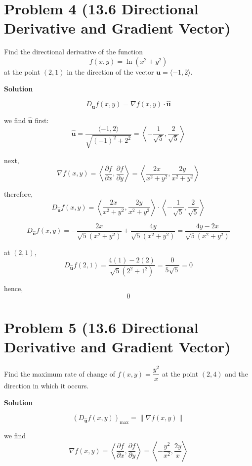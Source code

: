 \documentclass{article}
\newcommand{\solution}{\textbf{\large Solution}}
\theoremstyle{remark}
\begin{document}
\vspace{1em}
\hrulefill

\section*{Problem 4 (13.6 Directional Derivative and Gradient Vector)}
Find the directional derivative of the function
\[
    f(x,y) = \ln(x^2+y^2)
\]
at the point $(2,1)$ in the direction of the vector $\mathbf{u} = \langle -1,2 \rangle$.

\medskip
\solution

\[
    D_{\hat{\mathbf{u}}}f(x,y) = \nabla f(x,y) \cdot \hat{\mathbf{u}}
\]

we find $\hat{\mathbf{u}}$ first:
\[
    \hat{\mathbf{u}} = \frac{\langle -1,2 \rangle}{\sqrt{(-1)^2+2^2}} = \left\langle -\frac{1}{\sqrt{5}}, \frac{2}{\sqrt{5}} \right\rangle
\]

next,
\[
    \nabla f(x,y) = \left\langle \frac{\partial f}{\partial x}, \frac{\partial f}{\partial y} \right\rangle
    = \left\langle \frac{2x}{x^2+y^2}, \frac{2y}{x^2+y^2} \right\rangle
\]

therefore,
\[
    D_{\hat{\mathbf{u}}}f(x,y) = \left\langle \frac{2x}{x^2+y^2}, \frac{2y}{x^2+y^2} \right\rangle \cdot \left\langle -\frac{1}{\sqrt{5}}, \frac{2}{\sqrt{5}} \right\rangle
\]

\[
    D_{\hat{\mathbf{u}}}f(x,y) = -\frac{2x}{\sqrt{5}(x^2+y^2)} + \frac{4y}{\sqrt{5}(x^2+y^2)}
    = \frac{4y-2x}{\sqrt{5}(x^2+y^2)}
\]

at $(2,1)$,
\[
    D_{\hat{\mathbf{u}}}f(2,1) = \frac{4(1)-2(2)}{\sqrt{5}(2^2+1^2)} = \frac{0}{5\sqrt{5}} = 0
\]

hence,
\[
    \boxed{0}
\]

\vspace{1em}
\hrulefill

\section*{Problem 5 (13.6 Directional Derivative and Gradient Vector)}
Find the maximum rate of change of $f(x,y) = \dfrac{y^2}{x}$ at the point $(2,4)$ and the direction in which it occurs.

\medskip
\solution

\[
    \left(D_{\hat{\mathbf{u}}}f(x,y)\right)_{\max} = \|\nabla f(x,y)\|
\]

we find
\[
    \nabla f(x,y) = \left\langle \frac{\partial f}{\partial x}, \frac{\partial f}{\partial y} \right\rangle
    = \left\langle -\frac{y^2}{x^2}, \frac{2y}{x} \right\rangle
\]
\end{document}
